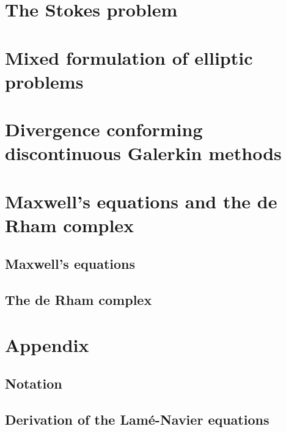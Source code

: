 \chapter{The Stokes problem}
\label{cha:stokes}


\chapter{Mixed formulation of elliptic problems}
\label{cha:darcy}


\chapter{Divergence conforming discontinuous Galerkin methods}
\label{cha:hdivdg}


\chapter{Maxwell's equations and the de Rham complex}
\section{Maxwell's equations}
\label{cha:maxwell}


\section{The de Rham complex}
\label{cha:derham}


\appendix
\chapter{Appendix}
\section{Notation}



\section{Derivation of the Lamé-Navier equations}
\label{sec:lame-navier}




\printindex



